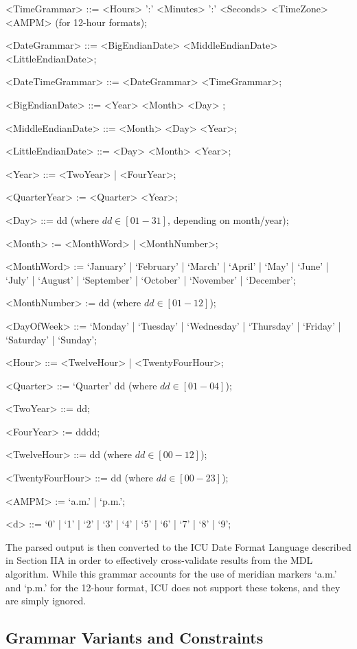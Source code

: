 \begin{grammar}
<TimeGrammar> ::= <Hours> ':' <Minutes> ':' <Seconds> <TimeZone> <AMPM> (for 12-hour formats);

<DateGrammar> ::= <BigEndianDate> 
				\alt <MiddleEndianDate> 
				\alt <LittleEndianDate>;

<DateTimeGrammar>  ::= <DateGrammar> 
					\alt <TimeGrammar>;
					

<BigEndianDate> ::= <Year> <Month>  <Day> ;

<MiddleEndianDate> ::= <Month> <Day> <Year>;

<LittleEndianDate> ::= <Day> <Month> <Year>;

<Year> ::= <TwoYear> | <FourYear>;

<QuarterYear> := <Quarter> <Year>;

<Day>     ::= dd (where $dd \in [01-31]$, depending on month/year);

<Month> := <MonthWord> | <MonthNumber>;

<MonthWord> := `January' | `February' | `March' | `April' | `May' | `June' | `July' | `August' | `September' | `October' | `November' | `December';

<MonthNumber> := dd (where $dd \in [01-12]$);

<DayOfWeek> ::= `Monday' | `Tuesday' | `Wednesday' | `Thursday' | `Friday' | `Saturday' | `Sunday';

<Hour> ::= <TwelveHour> | <TwentyFourHour>;

<Quarter> ::= `Quarter' dd (where $dd \in [01 - 04]$);

<TwoYear> ::= dd;

<FourYear> := dddd;

<TwelveHour> ::= dd (where $dd \in [00-12]$);

<TwentyFourHour> ::= dd (where $dd \in [00 -23]$);

<AMPM> := `a.m.' | `p.m.';

<d> ::= `0' | `1' | `2' | `3' | `4' | `5' | `6' | `7' | `8' | `9';

\end{grammar}


The parsed output is then converted to the ICU Date Format Language described in Section IIA in order to effectively cross-validate results from the MDL algorithm. While this grammar accounts for the use of meridian markers `a.m.' and `p.m.' for the 12-hour format, ICU does not support these tokens, and they are simply ignored.

\subsection{Grammar Variants and Constraints}

